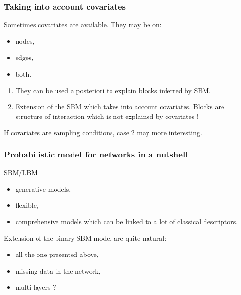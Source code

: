 \documentclass[nopagenumber,9pt]{beamer}
\begin{document}
\begin{frame}
 \frametitle{Taking into account covariates}
 
 Sometimes covariates are available. They may be on:
 \begin{itemize}
  \item nodes,
  \item edges,
  \item both.
 \end{itemize}

 \bigskip
 
 
 \begin{enumerate}
  \item They can be used a posteriori to explain blocks inferred by SBM.
  \item Extension of the SBM which takes into account covariates. Blocks are structure of interaction which is not 
  explained by covariates !
 \end{enumerate}

 \bigskip
 
 If covariates are sampling conditions, case 2 may more interesting.
 
\end{frame}




\begin{frame}
 \frametitle{Probabilistic model for networks in a nutshell}
 
 SBM/LBM
 \begin{itemize}
  \item generative models,
  \item flexible,
  \item comprehensive models which can be linked to a lot of classical descriptors.
  
 \end{itemize}

 \bigskip
 Extension of the binary SBM model are quite natural:
 
 \begin{itemize}
  \item all the one presented above,
  \item missing data in the network,
  \item multi-layers ?
 \end{itemize}

 
 
\end{frame}
\end{document}
